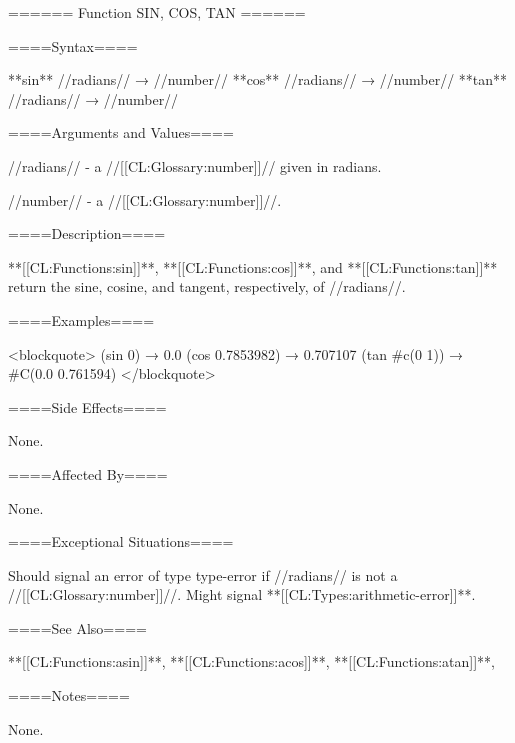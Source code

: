 ====== Function SIN, COS, TAN ======

====Syntax====

**sin** //radians// → //number// **cos** //radians// → //number// **tan** //radians// → //number//

====Arguments and Values====

//radians// - a //[[CL:Glossary:number]]// given in radians.

//number// - a //[[CL:Glossary:number]]//.

====Description====

**[[CL:Functions:sin]]**, **[[CL:Functions:cos]]**, and **[[CL:Functions:tan]]** return the sine, cosine, and tangent, respectively, of //radians//.

====Examples====

<blockquote> (sin 0) → 0.0 (cos 0.7853982) → 0.707107 (tan #c(0 1)) → #C(0.0 0.761594) </blockquote>

====Side Effects====

None.

====Affected By====

None.

====Exceptional Situations====

Should signal an error of type type-error if //radians// is not a //[[CL:Glossary:number]]//. Might signal **[[CL:Types:arithmetic-error]]**.

====See Also====

**[[CL:Functions:asin]]**, **[[CL:Functions:acos]]**, **[[CL:Functions:atan]]**, {\secref\FloatSubstitutability}

====Notes====

None.

